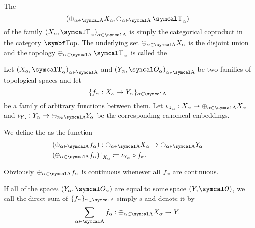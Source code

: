 \begin{definition}\label{def:topological_sum}\cite[74]{Engelking1989}
  The 
  \begin{equation*}
    (\oplus_{\al \in \CA} X_\al, \oplus_{\al \in \CA} \CT_\al)
  \end{equation*}
  of the family \( { (X_\al, \CT_\al) }_{\al \in \CA} \) is simply the categorical coproduct in the category \( \Cat{Top} \). The underlying set \( \oplus_{\al \in \CA} X_\al \) is the disjoint \hyperref[def:disjoint_union]{union} and the topology \( \oplus_{\al \in \CA} \CT_\al \) is called the .

  Let \( { (X_\al, \CT_\al) }_{\al \in \CA} \) and \( { (Y_\al, \Cal{O}_\al) }_{\al \in \CA} \) be two families of topological spaces and let 
  \begin{equation*}
    \{ f_\al: X_\al \to Y_\al \}_{\al \in \CA}
  \end{equation*}
  be a family of arbitrary functions between them. Let \( \iota_{X_\al}: X_\al \to \oplus_{\al \in \CA} X_\al \) and \( \iota_{Y_\al}: Y_\al \to \oplus_{\al \in \CA} Y_\al \) be the corresponding canonical embeddings.

  We define the  as the function
  \begin{align*}
    &(\oplus_{\al \in \CA} f_\al): \oplus_{\al \in \CA} X_\al \to \oplus_{\al \in \CA} Y_\al \\
    &(\oplus_{\al \in \CA} f_\al){\restriction}_{X_\al} \coloneqq \iota_{Y_\al} \circ f_\al.
  \end{align*}

  Obviously \( \oplus_{\al \in \CA} f_\al \) is continuous whenever all \( f_\alpha \) are continuous.

  If all of the spaces \( (Y_\al, \Cal{O}_\al) \) are equal to some space \( (Y, \Cal{O}) \), we call the direct sum of \( \{ f_\al \}_{\al \in \CA} \) simply a  and denote it by
  \begin{equation*}
    \sum_{\al \in \CA} f_\al: \oplus_{\al \in \CA} X_\al \to Y.
  \end{equation*}
\end{definition}
